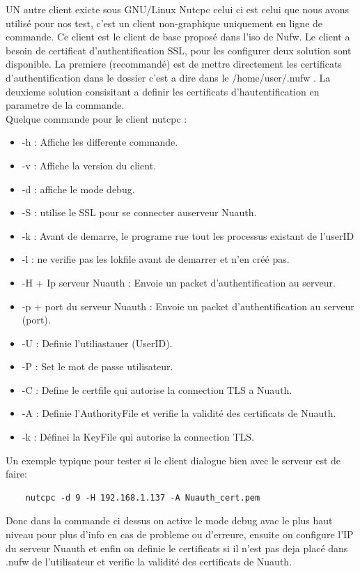 \documentclass[12pt]{report}
\begin{document}
\begin{itemize}
\begin{center}
\end{center}
\vspace{1,5cm}
UN autre client exicte sous GNU/Linux Nutcpc celui ci est celui que nous avons utilisé pour nos test, c'est un client non-graphique uniquement en ligne de commande. Ce client est le client de base proposé dans l'iso de Nufw. Le client a besoin de certificat d'authentification SSL, pour les configurer deux solution sont disponible. La premiere (recommandé) est de mettre directement les certificats d'authentification dans le dossier c'est a dire dans le /home/user/.nufw . La deuxieme solution consisitant a definir les certificats d'hautentification en parametre de la commande.\\
Quelque commande pour le client nutcpc :
\newpagge
\begin{itemize}
	\item -h : Affiche les differente commande.
	\item -v : Affiche la version du client.
	\item -d : affiche le mode debug.
	\item -S : utilise le SSL pour se connecter auserveur Nuauth.
	\item -k : Avant de demarre, le programe rue tout les processus existant de l'userID
	\item -l : ne verifie pas les lokfile avant de demarrer et n'en créé pas.
	\item -H + Ip serveur Nuauth : Envoie un packet d'authentification au serveur.
	\item -p + port du serveur Nuauth : Envoie un packet d'authentification au serveur (port).
	\item -U : Definie l'utiliastauer (UserID).
	\item -P : Set le mot de passe utilisateur.
	\item -C : Define le certfile qui autorise la connection TLS a Nuauth.
	\item -A : Definie l'AuthorityFile et verifie la validité des certificats de Nuauth.
	\item -k : Définei la KeyFile qui autorise la connection TLS.
\end{itemize}
\vspace{0,7cm}
Un exemple typique pour tester si le client dialogue bien avec le serveur est de faire:
\begin{verbatim}
	nutcpc -d 9 -H 192.168.1.137 -A Nuauth_cert.pem
\end{verbatim}
Donc dans la commande ci dessus on active le mode debug avac le plus haut niveau pour plus d'info en cas de probleme ou d'erreure, ensuite on configure l'IP du serveur Nuauth et enfin on definie le certificats si il n'est pas deja placé dans .nufw de l'utilisateur et verifie la validité des certificats de Nuauth.

\end{itemize}
\end{document}
